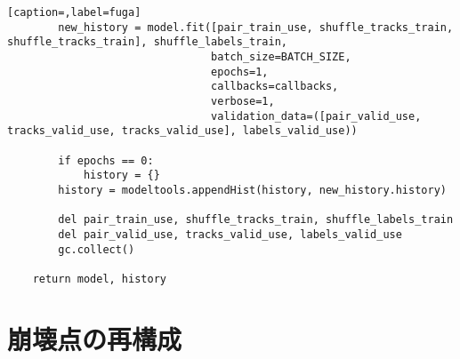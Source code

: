 \begin{lstlisting}[caption=,label=fuga]
        new_history = model.fit([pair_train_use, shuffle_tracks_train, shuffle_tracks_train], shuffle_labels_train,
                                batch_size=BATCH_SIZE,
                                epochs=1,
                                callbacks=callbacks,
                                verbose=1,
                                validation_data=([pair_valid_use, tracks_valid_use, tracks_valid_use], labels_valid_use))

        if epochs == 0:
            history = {}
        history = modeltools.appendHist(history, new_history.history)

        del pair_train_use, shuffle_tracks_train, shuffle_labels_train
        del pair_valid_use, tracks_valid_use, labels_valid_use
        gc.collect()

    return model, history    
\end{lstlisting}


\section{崩壊点の再構成} \label{sec:CodePairProduction}

